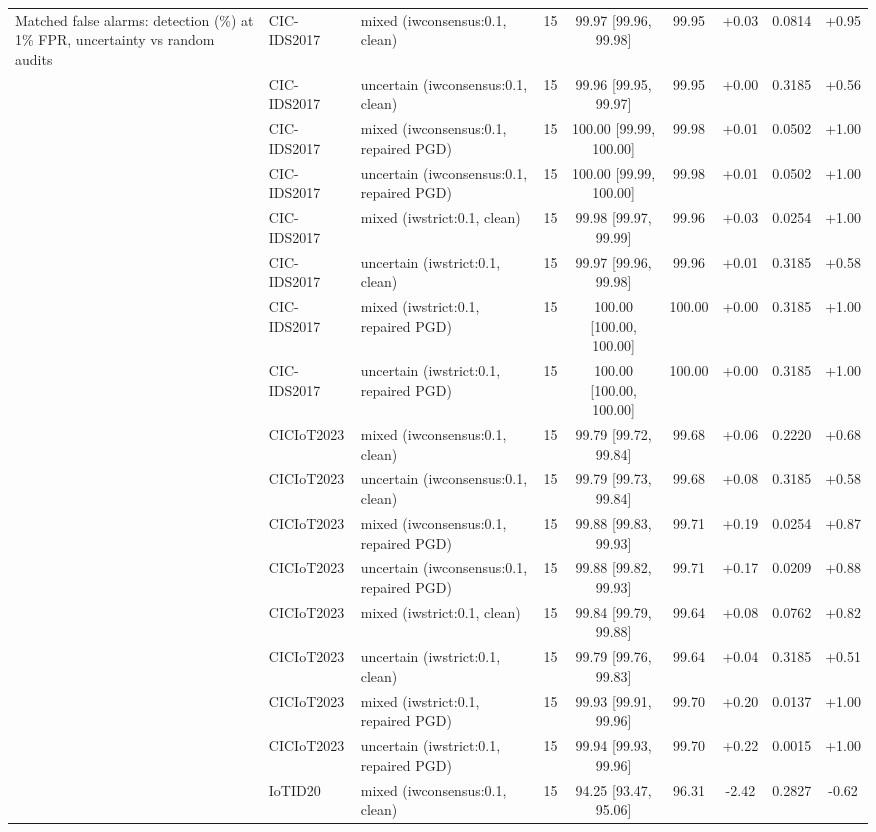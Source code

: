 \begin{table}[t]
\begin{tabular}{lllcccccc}
Matched false alarms: detection (\%) at 1\% FPR, uncertainty vs random audits & CIC-IDS2017 & mixed (iwconsensus:0.1, clean) & 15 & 99.97 [99.96, 99.98] & 99.95 & +0.03 & 0.0814 & +0.95 \\
 & CIC-IDS2017 & uncertain (iwconsensus:0.1, clean) & 15 & 99.96 [99.95, 99.97] & 99.95 & +0.00 & 0.3185 & +0.56 \\
 & CIC-IDS2017 & mixed (iwconsensus:0.1, repaired PGD) & 15 & 100.00 [99.99, 100.00] & 99.98 & +0.01 & 0.0502 & +1.00 \\
 & CIC-IDS2017 & uncertain (iwconsensus:0.1, repaired PGD) & 15 & 100.00 [99.99, 100.00] & 99.98 & +0.01 & 0.0502 & +1.00 \\
 & CIC-IDS2017 & mixed (iwstrict:0.1, clean) & 15 & 99.98 [99.97, 99.99] & 99.96 & +0.03 & 0.0254 & +1.00 \\
 & CIC-IDS2017 & uncertain (iwstrict:0.1, clean) & 15 & 99.97 [99.96, 99.98] & 99.96 & +0.01 & 0.3185 & +0.58 \\
 & CIC-IDS2017 & mixed (iwstrict:0.1, repaired PGD) & 15 & 100.00 [100.00, 100.00] & 100.00 & +0.00 & 0.3185 & +1.00 \\
 & CIC-IDS2017 & uncertain (iwstrict:0.1, repaired PGD) & 15 & 100.00 [100.00, 100.00] & 100.00 & +0.00 & 0.3185 & +1.00 \\
 & CICIoT2023 & mixed (iwconsensus:0.1, clean) & 15 & 99.79 [99.72, 99.84] & 99.68 & +0.06 & 0.2220 & +0.68 \\
 & CICIoT2023 & uncertain (iwconsensus:0.1, clean) & 15 & 99.79 [99.73, 99.84] & 99.68 & +0.08 & 0.3185 & +0.58 \\
 & CICIoT2023 & mixed (iwconsensus:0.1, repaired PGD) & 15 & 99.88 [99.83, 99.93] & 99.71 & +0.19 & 0.0254 & +0.87 \\
 & CICIoT2023 & uncertain (iwconsensus:0.1, repaired PGD) & 15 & 99.88 [99.82, 99.93] & 99.71 & +0.17 & 0.0209 & +0.88 \\
 & CICIoT2023 & mixed (iwstrict:0.1, clean) & 15 & 99.84 [99.79, 99.88] & 99.64 & +0.08 & 0.0762 & +0.82 \\
 & CICIoT2023 & uncertain (iwstrict:0.1, clean) & 15 & 99.79 [99.76, 99.83] & 99.64 & +0.04 & 0.3185 & +0.51 \\
 & CICIoT2023 & mixed (iwstrict:0.1, repaired PGD) & 15 & 99.93 [99.91, 99.96] & 99.70 & +0.20 & 0.0137 & +1.00 \\
 & CICIoT2023 & uncertain (iwstrict:0.1, repaired PGD) & 15 & 99.94 [99.93, 99.96] & 99.70 & +0.22 & 0.0015 & +1.00 \\
 & IoTID20 & mixed (iwconsensus:0.1, clean) & 15 & 94.25 [93.47, 95.06] & 96.31 & -2.42 & 0.2827 & -0.62 \\

\end{tabular}
\end{table}
